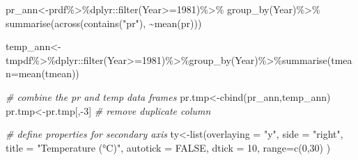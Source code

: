 \documentclass[
]{book}
\newenvironment{Shaded}{\begin{snugshade}}{\end{snugshade}}
\newcommand{\AttributeTok}[1]{\textcolor[rgb]{0.77,0.63,0.00}{#1}}
\newcommand{\CommentTok}[1]{\textcolor[rgb]{0.56,0.35,0.01}{\textit{#1}}}
\newcommand{\ConstantTok}[1]{\textcolor[rgb]{0.00,0.00,0.00}{#1}}
\newcommand{\DecValTok}[1]{\textcolor[rgb]{0.00,0.00,0.81}{#1}}
\newcommand{\FunctionTok}[1]{\textcolor[rgb]{0.00,0.00,0.00}{#1}}
\newcommand{\NormalTok}[1]{#1}
\newcommand{\OtherTok}[1]{\textcolor[rgb]{0.56,0.35,0.01}{#1}}
\newcommand{\SpecialCharTok}[1]{\textcolor[rgb]{0.00,0.00,0.00}{#1}}
\newcommand{\StringTok}[1]{\textcolor[rgb]{0.31,0.60,0.02}{#1}}
\begin{document}
\begin{Shaded}
\begin{Highlighting}[]
\NormalTok{pr\_ann}\OtherTok{\textless{}{-}}\NormalTok{prdf}\SpecialCharTok{\%\textgreater{}\%}\NormalTok{dplyr}\SpecialCharTok{::}\FunctionTok{filter}\NormalTok{(Year}\SpecialCharTok{\textgreater{}=}\DecValTok{1981}\NormalTok{)}\SpecialCharTok{\%\textgreater{}\%} \FunctionTok{group\_by}\NormalTok{(Year)}\SpecialCharTok{\%\textgreater{}\%}
  \FunctionTok{summarise}\NormalTok{(}\FunctionTok{across}\NormalTok{(}\FunctionTok{contains}\NormalTok{(}\StringTok{"pr"}\NormalTok{), }\SpecialCharTok{\textasciitilde{}}\FunctionTok{mean}\NormalTok{(pr))) }


\NormalTok{temp\_ann}\OtherTok{\textless{}{-}}\NormalTok{tmpdf}\SpecialCharTok{\%\textgreater{}\%}\NormalTok{dplyr}\SpecialCharTok{::}\FunctionTok{filter}\NormalTok{(Year}\SpecialCharTok{\textgreater{}=}\DecValTok{1981}\NormalTok{)}\SpecialCharTok{\%\textgreater{}\%}\FunctionTok{group\_by}\NormalTok{(Year)}\SpecialCharTok{\%\textgreater{}\%}\FunctionTok{summarise}\NormalTok{(}\StringTok{\textquotesingle{}tmean\textquotesingle{}}\OtherTok{=}\FunctionTok{mean}\NormalTok{(tmean))}

\CommentTok{\# combine the pr and temp data frames}
\NormalTok{pr.tmp}\OtherTok{\textless{}{-}}\FunctionTok{cbind}\NormalTok{(pr\_ann,temp\_ann) }
\NormalTok{pr.tmp}\OtherTok{\textless{}{-}}\NormalTok{pr.tmp[,}\SpecialCharTok{{-}}\DecValTok{3}\NormalTok{] }\CommentTok{\# remove duplicate column}

\CommentTok{\# define properties for secondary axis}
\NormalTok{ty}\OtherTok{\textless{}{-}}\FunctionTok{list}\NormalTok{(}\AttributeTok{overlaying =} \StringTok{"y"}\NormalTok{,}
  \AttributeTok{side =} \StringTok{"right"}\NormalTok{,}
  \AttributeTok{title =} \StringTok{"Temperature (°C)"}\NormalTok{,}
  \AttributeTok{autotick =} \ConstantTok{FALSE}\NormalTok{,}
      \AttributeTok{dtick =} \DecValTok{10}\NormalTok{,}
 \AttributeTok{range=}\FunctionTok{c}\NormalTok{(}\DecValTok{0}\NormalTok{,}\DecValTok{30}\NormalTok{)}
\NormalTok{  )}


\end{Highlighting}
\end{Shaded}
\end{document}

